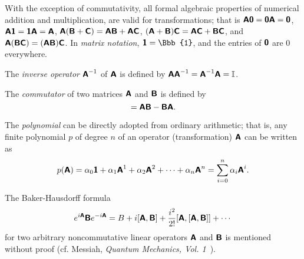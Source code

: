 With the exception of commutativity, all formal algebraic properties
of numerical addition and multiplication,
are valid for transformations; that is
$
\textsf{\textbf{A}}\textsf{\textbf{0}}=
\textsf{\textbf{0}}\textsf{\textbf{A}} =\textsf{\textbf{0}}
$,
$
\textsf{\textbf{A}}\textsf{\textbf{1}}=
\textsf{\textbf{1}}\textsf{\textbf{A}} =\textsf{\textbf{A}}
$,
$
\textsf{\textbf{A}} (\textsf{\textbf{B}}+\textsf{\textbf{C}})=
\textsf{\textbf{A}} \textsf{\textbf{B}}
+
\textsf{\textbf{A}} \textsf{\textbf{C}}
$,
$
(\textsf{\textbf{A}}+ \textsf{\textbf{B}})\textsf{\textbf{C}}=
\textsf{\textbf{A}} \textsf{\textbf{C}}
+
\textsf{\textbf{B}} \textsf{\textbf{C}}
$,  and
$
\textsf{\textbf{A}} (\textsf{\textbf{B}}\textsf{\textbf{C}})=
(\textsf{\textbf{A}} \textsf{\textbf{B}})
 \textsf{\textbf{C}}
$.
In {\em matrix notation},  $\textsf{\textbf{1}} ={\Bbb{1}}$, and the entries of $\textsf{\textbf{0}}$
are $0$ everywhere.

The {\em inverse operator}
$\textsf{\textbf{A}}^{-1}$
of $\textsf{\textbf{A}}$
is defined by
$\textsf{\textbf{A}}\textsf{\textbf{A}}^{-1}=\textsf{\textbf{A}}^{-1}\textsf{\textbf{A}}=
{\Bbb I}$.


The {\em commutator}
of two matrices $\textsf{\textbf{A}}$  and $\textsf{\textbf{B}}$ is defined by
\begin{equation}
[\textsf{\textbf{A}}, \textsf{\textbf{B}} ]
=
\textsf{\textbf{A}} \textsf{\textbf{B}}
-
 \textsf{\textbf{B}}      \textsf{\textbf{A}}.
\end{equation}

The {\em polynomial}
can be directly adopted from ordinary arithmetic; that is,
any finite polynomial $p$ of degree $n$
of an operator (transformation) $\textsf{\textbf{A}}$ can be written as
\begin{equation}
p(\textsf{\textbf{A}})= \alpha_0   \textsf{\textbf{1}}
+ \alpha_1   \textsf{\textbf{A}}^1
+ \alpha_2   \textsf{\textbf{A}}^2+
\cdots
+
\alpha_n   \textsf{\textbf{A}}^n
=\sum_{i=0}^n \alpha_i \textsf{\textbf{A}}^i
.
\end{equation}

The Baker-Hausdorff formula
 \begin{equation}
 e^{i\textsf{\textbf{A}}}\textsf{\textbf{B}}e^{-i\textsf{\textbf{A}}}=
B+i[\textsf{\textbf{A}},\textsf{\textbf{B}}]+
{i^2\over 2!}[\textsf{\textbf{A}},[\textsf{\textbf{A}},\textsf{\textbf{B}}]]+\cdots
 \end{equation}
for two arbitrary noncommutative linear operators $\textsf{\textbf{A}}$ and
$\textsf{\textbf{B}}$ is mentioned without proof
(cf.  Messiah, {\sl Quantum Mechanics, Vol. 1}~\cite{messiah-61}).

